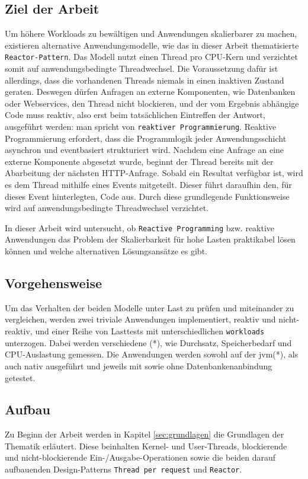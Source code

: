 \subsection{Ziel der Arbeit}
\label{subsec:ziel}
Um höhere Workloads zu bewältigen und Anwendungen skalierbarer zu machen, existieren alternative
Anwendungsmodelle, wie das in dieser Arbeit thematisierte \verb|Reactor-Pattern|.
Das Modell nutzt einen Thread pro CPU-Kern und verzichtet somit auf anwendungsbedingte Threadwechsel.
Die Voraussetzung dafür ist allerdings, dass die vorhandenen Threads niemals in einen inaktiven Zustand geraten.
Deswegen dürfen Anfragen an externe Komponenten, wie Datenbanken oder Webservices, den Thread nicht blockieren,
und der vom Ergebnis abhängige Code muss reaktiv, also erst beim tatsächlichen Eintreffen der Antwort,
ausgeführt werden: man spricht von \verb|reaktiver Programmierung|.
Reaktive Programmierung erfordert, dass die Programmlogik jeder
Anwendungsschicht asynchron und eventbasiert strukturiert wird.
Nachdem eine Anfrage an eine externe Komponente abgesetzt wurde, beginnt der Thread bereits mit der Abarbeitung der nächsten
HTTP-Anfrage. Sobald ein Resultat verfügbar ist, wird es dem Thread mithilfe eines Events mitgeteilt.
Dieser führt daraufhin den, für dieses Event hinterlegten, Code aus. Durch diese grundlegende Funktionsweise wird auf anwendungsbedingte
Threadwechsel verzichtet.

In dieser Arbeit wird untersucht, ob \verb|Reactive Programming| bzw. reaktive Anwendungen das Problem der Skalierbarkeit
für hohe Lasten praktikabel lösen können und welche alternativen Lösungsansätze es gibt.

\subsection{Vorgehensweise}
\label{subsec:vorgehensweise}
Um das Verhalten der beiden Modelle unter Last zu prüfen und miteinander zu vergleichen, werden zwei triviale Anwendungen implementiert,
reaktiv und nicht-reaktiv, und einer Reihe von Lasttests mit unterschiedlichen \verb|workloads| unterzogen.
Dabei werden verschiedene (*), wie Durchsatz, Speicherbedarf und CPU-Auslastung gemessen.
Die Anwendungen werden sowohl auf der \acrshort{jvm}(*), als auch nativ ausgeführt und jeweils mit sowie ohne Datenbankenanbindung getestet.

\subsection{Aufbau}
\label{subsec:aufbau}
Zu Beginn der Arbeit werden in Kapitel \ref{sec:grundlagen} die Grundlagen der Thematik erläutert. Diese beinhalten
Kernel- und User-Threads, blockierende und nicht-blockierende Ein-/Ausgabe-Operationen sowie die beiden darauf aufbauenden Design-Patterns
\verb|Thread per request| und \verb|Reactor|.


